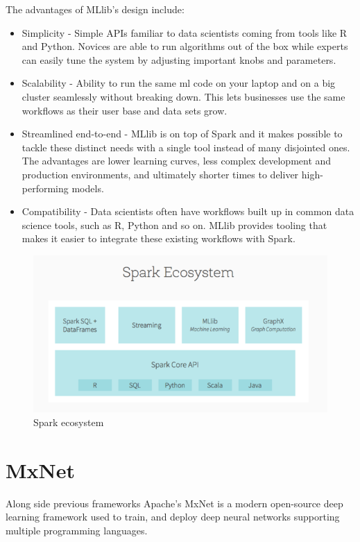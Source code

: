 \documentclass[thesis=M,english]{FITthesis}[2012/06/26]
\begin{document}
The advantages of MLlib’s design include:

\begin{itemize}[nosep]
\item Simplicity
- Simple APIs familiar to data scientists coming from tools like R and Python. Novices are able to run algorithms out of the box while experts can easily tune the system by adjusting important knobs and parameters.
\item Scalability
- Ability to run the same \acrshort{ml} code on your laptop and on a big cluster seamlessly without breaking down. This lets businesses use the same workflows as their user base and data sets grow.
\item Streamlined end-to-end
- MLlib is on top of Spark and it makes possible to tackle these distinct needs with a single tool instead of many disjointed ones. The advantages are lower learning curves, less complex development and production environments, and ultimately shorter times to deliver high-performing models.
\item Compatibility
- Data scientists often have workflows built up in common data science tools, such as R, Python and so on. MLlib provides tooling that makes it easier to integrate these existing workflows with Spark. 
\end{itemize}


\begin{figure}[h!]\centering
	\includegraphics[width=1\textwidth]{pictures/ml_spark_ecosystem}
	\caption{Spark ecosystem \cite{ml_spark_advantages}}\label{fig:ml_spark_ecosystem}
\end{figure}
\pagebreak
\section{MxNet}

Along\cite{ml_mxnet} side previous frameworks Apache's MxNet is a modern open-source deep learning framework used to train, and deploy deep neural networks supporting multiple programming languages.
\end{document}
